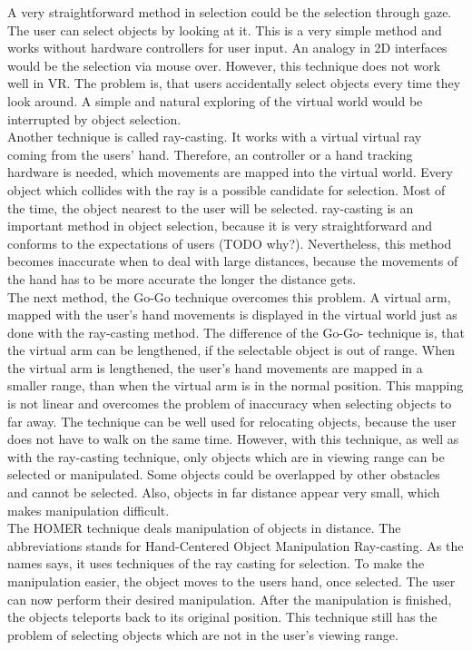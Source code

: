 A very straightforward method in selection could be the selection through gaze. The user can select objects by looking at it. This is a very simple method and works without hardware controllers for user input. An analogy in 2D interfaces would be the selection via mouse over. However, this technique does not work well in VR. The problem is, that users accidentally select objects every time they look around. A simple and natural exploring of the virtual world would be interrupted by object selection.\\
Another technique is called ray-casting. It works with a virtual virtual ray coming from the users' hand. Therefore, an controller or a hand tracking hardware is needed, which movements are mapped into the virtual world. Every object which collides with the ray is a possible candidate for selection. Most of the time, the object nearest to the user will be selected. ray-casting is an important method in object selection, because it is very straightforward and conforms to the expectations of users (TODO why?). Nevertheless, this method becomes inaccurate when to deal with large distances, because the movements of the hand has to be more accurate the longer the distance gets. \\
The next method, the Go-Go technique overcomes this problem. A virtual arm, mapped with the user's hand movements is displayed in the virtual world just as done with the ray-casting method. The difference of the Go-Go- technique is, that the virtual arm can be lengthened, if the selectable object is out of range. When the virtual arm is lengthened, the user's hand movements are mapped in a smaller range, than when the virtual arm is in the normal position. This mapping is not linear and overcomes the problem of inaccuracy when selecting objects to far away. The technique can be well used for relocating objects, because the user does not have to walk on the same time. However, with this technique, as well as with the ray-casting technique, only objects which are in viewing range can be selected or manipulated. Some objects could be overlapped by other obstacles and cannot be selected. Also, objects in far distance appear very small, which makes manipulation difficult.\\
The HOMER technique deals manipulation of objects in distance. The abbreviations stands for Hand-Centered Object Manipulation Ray-casting. As the names says, it uses techniques of the ray casting for selection. To make the manipulation easier, the object moves to the users hand, once selected. The user can now perform their desired manipulation. After the manipulation is finished, the objects teleports back to its original position. This technique still has the problem of selecting objects which are not in the user's viewing range.\\
